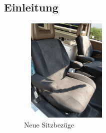 ﻿%
% 
% 
%



\subsection{Einleitung} 

\begin{figure} 
  \begin{centering}
    \includegraphics[width=0.4\textwidth, height=5cm, keepaspectratio]{../Bilder/Sylt/1.png}
    \caption{Neue Sitzbezüge}
  \end{centering}
\end{figure} 

